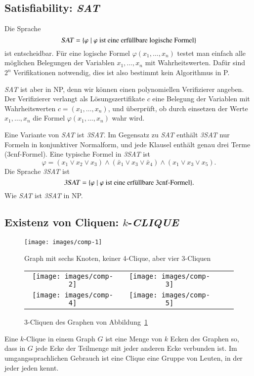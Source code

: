 \subsection{Satisfiability: \textsl{SAT}}
%
%
Die Sprache 
\[
\text{\textsl{SAT}}=\{\varphi\;|\;\text{$\varphi$ ist eine erfüllbare logische Formel}\}
\]
ist entscheidbar. Für eine logische Formel $\varphi(x_1,\dots,x_n)$
testet man einfach alle möglichen Belegungen der Variablen $x_1,\dots,x_n$
mit Wahrheitswerten.
Dafür sind $2^n$ Verifikationen notwendig, dies ist also
bestimmt kein Algorithmus in P.

\textsl{SAT} ist aber in NP,
denn wir können einen polynomiellen Verifizierer angeben.
Der Verifizierer verlangt als Lösungszertifikate $c$ eine
Belegung der Variablen mit Wahrheitswerten $c=(x_1,\dots,x_n)$,
und überprüft, ob durch einsetzen der Werte $x_1,\dots,x_n$
die Formel $\varphi(x_1,\dots,x_n)$ wahr wird.

Eine Variante von \textsl{SAT} ist \textsl{3SAT}.
Im Gegensatz zu \textsl{SAT} enthält \textsl{3SAT}
nur Formeln in konjunktiver Normalform, und jede Klausel
enthält genau drei Terme (3cnf-Formel).
Eine typische Formel in \textsl{3SAT} ist 
\[
\varphi=(x_1\vee x_2\vee x_3)\wedge (\bar x_1\vee x_3\vee \bar x_4)\wedge
	(x_1\vee x_3\vee x_5).
\]
Die Sprache \textsl{3SAT} ist
\[
\text{\textsl{3SAT}} =\{\varphi\;|\; \text{$\varphi$ ist eine erfüllbare 3cnf-Formel}\}.
\]
Wie \textsl{SAT} ist \textsl{3SAT} in NP.

\subsection{Existenz von Cliquen: \texorpdfstring{$k$}{k}-\textsl{CLIQUE}}
\begin{figure}
\begin{center}
\texttt{[image: images/comp-1]}
\end{center}
\caption{Graph mit sechs Knoten, keiner 4-Clique, aber
vier 3-Cliquen\label{6graph}}
\end{figure}%
\begin{figure}
\begin{center}
\begin{tabular}{cccc}
\texttt{[image: images/comp-2]}&%
\texttt{[image: images/comp-3]}\\
\texttt{[image: images/comp-4]}&%
\texttt{[image: images/comp-5]}
\end{tabular}
\end{center}
\caption{3-Cliquen des Graphen von Abbildung~\ref{6graph}}
\end{figure}%
%
%
%
%
Eine $k$-Clique in einem Graph $G$ ist eine Menge von $k$
Ecken des Graphen so, dass in $G$ jede Ecke der Teilmenge mit
jeder anderen Ecke verbunden ist. Im umgangssprachlichen Gebrauch
ist eine Clique eine Gruppe von Leuten, in der jeder jeden kennt.

